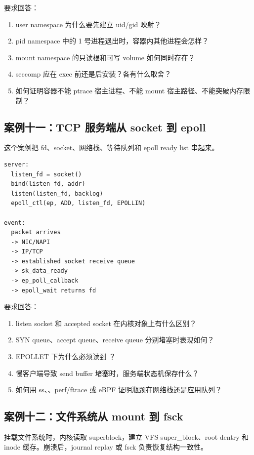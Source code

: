 要求回答：

\begin{enumerate}
\tightlist
\item user namespace 为什么要先建立 uid/gid 映射？
\item pid namespace 中的 1 号进程退出时，容器内其他进程会怎样？
\item mount namespace 的只读根和可写 volume 如何同时存在？
\item seccomp 应在 exec 前还是后安装？各有什么取舍？
\item 如何证明容器不能 ptrace 宿主进程、不能 mount 宿主路径、不能突破内存限制？
\end{enumerate}

\subsection{案例十一：TCP 服务端从 socket 到 epoll}

这个案例把 fd、socket、网络栈、等待队列和 epoll ready list 串起来。

\begin{lstlisting}
server:
  listen_fd = socket()
  bind(listen_fd, addr)
  listen(listen_fd, backlog)
  epoll_ctl(ep, ADD, listen_fd, EPOLLIN)

event:
  packet arrives
  -> NIC/NAPI
  -> IP/TCP
  -> established socket receive queue
  -> sk_data_ready
  -> ep_poll_callback
  -> epoll_wait returns fd
\end{lstlisting}

要求回答：

\begin{enumerate}
\tightlist
\item listen socket 和 accepted socket 在内核对象上有什么区别？
\item SYN queue、accept queue、receive queue 分别堵塞时表现如何？
\item EPOLLET 下为什么必须读到 ？
\item 慢客户端导致 send buffer 堵塞时，服务端状态机保存什么？
\item 如何用 ss、、perf/ftrace 或 eBPF 证明瓶颈在网络栈还是应用队列？
\end{enumerate}

\subsection{案例十二：文件系统从 mount 到 fsck}

挂载文件系统时，内核读取 superblock，建立 VFS super\_block、root dentry 和 inode 缓存。崩溃后，journal replay 或 fsck 负责恢复结构一致性。

